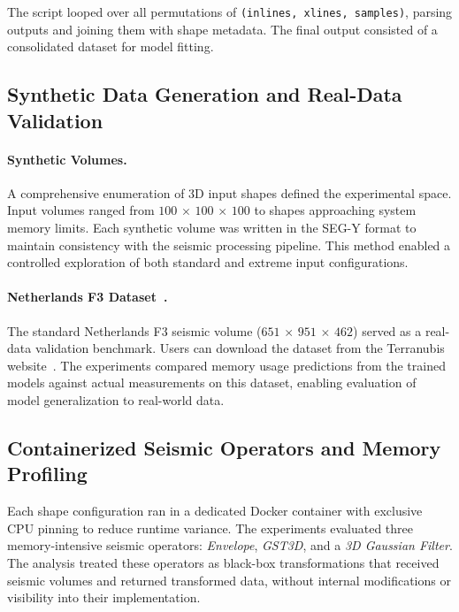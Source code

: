 The script looped over all permutations of \texttt{(inlines, xlines, samples)}, parsing \traceq outputs and joining them with shape metadata.
The final output consisted of a consolidated dataset for model fitting.

\subsection{Synthetic Data Generation and Real-Data Validation}
\label{subsec:pmc-synthetic-data-generation-and-real-data-validation}

\paragraph{Synthetic Volumes.}
A comprehensive enumeration of \ac{3D} input shapes defined the experimental space.
Input volumes ranged from $100$ $\times$ $100$ $\times$ $100$ to shapes approaching system memory limits.
Each synthetic volume was written in the \ac{SEG-Y} format to maintain consistency with the seismic processing pipeline.
This method enabled a controlled exploration of both standard and extreme input configurations.

\paragraph{Netherlands F3 Dataset~\cite{f3dataset}.}
The standard Netherlands F3 seismic volume ($651$ $\times$ $951$ $\times$ $462$) served as a real-data validation benchmark.
Users can download the dataset from the Terranubis website~\cite{f3dataset}.
The experiments compared memory usage predictions from the trained models against actual measurements on this dataset, enabling evaluation of model generalization to real-world data.

\subsection{Containerized Seismic Operators and Memory Profiling}
\label{subsec:containerized-seismic-operators-and-memory-profiling}

Each shape configuration ran in a dedicated Docker container with exclusive \ac{CPU} pinning to reduce runtime variance.
The experiments evaluated three memory-intensive seismic operators: \emph{Envelope}, \emph{\ac{GST3D}}, and a \emph{3D Gaussian Filter}.
The analysis treated these operators as black-box transformations that received seismic volumes and returned transformed data, without internal modifications or visibility into their implementation.

